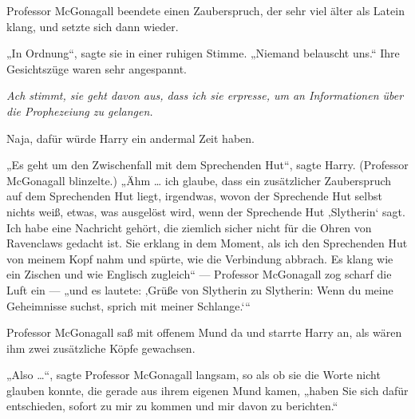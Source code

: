 Professor McGonagall beendete einen Zauberspruch, der sehr viel älter als Latein klang, und setzte sich dann wieder.

„In Ordnung“, sagte sie in einer ruhigen Stimme.
„Niemand belauscht uns.“ Ihre Gesichtszüge waren sehr angespannt.

\emph{Ach stimmt, sie geht davon aus, dass ich sie erpresse, um an Informationen über die Prophezeiung zu gelangen.}

Naja, dafür würde Harry ein andermal Zeit haben.

„Es geht um den Zwischenfall mit dem Sprechenden Hut“, sagte Harry. (Professor McGonagall blinzelte.) „Ähm … ich glaube, dass ein zusätzlicher Zauberspruch auf dem Sprechenden Hut liegt, irgendwas, wovon der Sprechende Hut selbst nichts weiß, etwas, was ausgelöst wird, wenn der Sprechende Hut ‚Slytherin‘ sagt. Ich habe eine Nachricht gehört, die ziemlich sicher nicht für die Ohren von Ravenclaws gedacht ist. Sie erklang in dem Moment, als ich den Sprechenden Hut von meinem Kopf nahm und spürte, wie die Verbindung abbrach. Es klang wie ein Zischen und wie Englisch zugleich“ — Professor McGonagall zog scharf die Luft ein — „und es lautete: ‚Grüße von Slytherin zu Slytherin: Wenn du meine Geheimnisse suchst, sprich mit meiner Schlange.‘“

Professor McGonagall saß mit offenem Mund da und starrte Harry an, als wären ihm zwei zusätzliche Köpfe gewachsen.

„Also …“, sagte Professor McGonagall langsam, so als ob sie die Worte nicht glauben konnte, die gerade aus ihrem eigenen Mund kamen, „haben Sie sich dafür entschieden, sofort zu mir zu kommen und mir davon zu berichten.“

